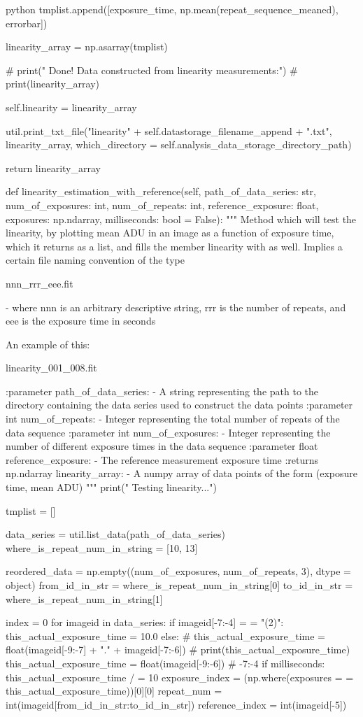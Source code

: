 \documentclass[../main.tex]{subfiles}
\begin{document}
\begin{mintedbox}{python}
tmplist.append([exposure_time, np.mean(repeat_sequence_meaned), errorbar])

linearity_array  =  np.asarray(tmplist)

# print("  Done! Data constructed from linearity measurements:")
# print(linearity_array)

self.linearity  =  linearity_array

util.print_txt_file("linearity" + self.datastorage_filename_append + ".txt", linearity_array,
which_directory = self.analysis_data_storage_directory_path)

return linearity_array

def linearity_estimation_with_reference(self, path_of_data_series: str, num_of_exposures: int, num_of_repeats: int,
reference_exposure: float, exposures: np.ndarray,
milliseconds: bool  =  False):
"""
Method which will test the linearity, by plotting mean ADU in an image
as a function of exposure time, which it returns as a list,
and fills the member linearity with as well. Implies a certain
file naming convention of the type

nnn_rrr_eee.fit

- where nnn is an arbitrary descriptive string, rrr
is the number of repeats, and eee is the exposure
time in seconds

An example of this:

linearity_001_008.fit

:parameter path_of_data_series:
- A string representing the path to the directory
containing the data series used to construct the data points
:parameter int num_of_repeats:
- Integer representing the total number of repeats of the data sequence
:parameter int num_of_exposures:
- Integer representing the number of different exposure times
in the data sequence
:parameter float reference_exposure:
- The reference measurement exposure time
:returns np.ndarray linearity_array:
- A numpy array of data points of the form (exposure time, mean ADU)
"""
print(" Testing linearity...")

tmplist  =  []

data_series  =  util.list_data(path_of_data_series)
where_is_repeat_num_in_string  =  [10, 13]

reordered_data  =  np.empty((num_of_exposures, num_of_repeats, 3), dtype = object)
from_id_in_str  =  where_is_repeat_num_in_string[0]
to_id_in_str  =  where_is_repeat_num_in_string[1]

index  =  0
for imageid in data_series:
if imageid[-7:-4]  =  =  "(2)":
this_actual_exposure_time  =  10.0
else:
# this_actual_exposure_time  =  float(imageid[-9:-7] + "." + imageid[-7:-6])
# print(this_actual_exposure_time)
this_actual_exposure_time  =  float(imageid[-9:-6])  # -7:-4
if milliseconds:
this_actual_exposure_time / =  10
exposure_index  =  (np.where(exposures  =  =  this_actual_exposure_time))[0][0]
repeat_num  =  int(imageid[from_id_in_str:to_id_in_str])
reference_index  =  int(imageid[-5])


\end{mintedbox}
\end{document}
